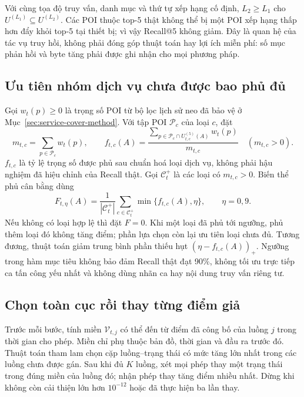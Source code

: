 Với cùng tọa độ truy vấn, danh mục và thứ tự xếp hạng cố định, $L_2\geq L_1$ cho $U^{(L_1)}\subseteq U^{(L_2)}$. Các POI thuộc top-5 thật không thể bị một POI xếp hạng thấp hơn đẩy khỏi top-5 tại thiết bị; vì vậy Recall@5 không giảm. Đây là quan hệ của tác vụ truy hồi, không phải đóng góp thuật toán hay lợi ích miễn phí: số mục phản hồi và byte tăng phải được ghi nhận cho mọi phương pháp.

\subsection{Ưu tiên nhóm dịch vụ chưa được bao phủ đủ}

Gọi $w_t(p)\geq0$ là trọng số POI từ bộ lọc lịch sử neo đã bảo vệ ở Mục~\ref{sec:service-cover-method}. Với tập POI $\mathcal P_c$ của loại $c$, đặt
\[
 m_{t,c}=\sum_{p\in\mathcal P_c}w_t(p),\qquad
 f_{t,c}(A)=\frac{\sum_{p\in\mathcal P_c\cap U_{t,c}^{(5)}(A)}w_t(p)}{m_{t,c}}
 \quad(m_{t,c}>0).
\]
$f_{t,c}$ là tỷ lệ trọng số được phủ sau chuẩn hoá loại dịch vụ, không phải hậu nghiệm đã hiệu chỉnh của Recall thật. Gọi $\mathcal C_t^+$ là các loại có $m_{t,c}>0$. Biến thể phủ cân bằng dùng
\begin{equation}
 F_{t,\eta}(A)=\frac{1}{|\mathcal C_t^+|}
       \sum_{c\in\mathcal C_t^+}\min\{f_{t,c}(A),\eta\},
 \qquad \eta=0{,}9.
 \label{eq:capped-service-cover}
\end{equation}
Nếu không có loại hợp lệ thì đặt $F=0$. Khi một loại đã phủ tới ngưỡng, phủ thêm loại đó không tăng điểm; phần lựa chọn còn lại ưu tiên loại chưa đủ. Tương đương, thuật toán giảm trung bình phần thiếu hụt $(\eta-f_{t,c}(A))_+$. Ngưỡng trong hàm mục tiêu không bảo đảm Recall thật đạt 90\%, không tối ưu trực tiếp ca tấn công yếu nhất và không dùng nhãn ca hay nội dung truy vấn riêng tư.

\subsection{Chọn toàn cục rồi thay từng điểm giả}

Trước mỗi bước, tính miền $\mathcal V_{t,j}$ có thể đến từ điểm đã công bố của luồng $j$ trong thời gian cho phép. Miền chỉ phụ thuộc bản đồ, thời gian và đầu ra trước đó. Thuật toán tham lam chọn cặp luồng--trạng thái có mức tăng lớn nhất trong các luồng chưa được gán. Sau khi đủ $K$ luồng, xét mọi phép thay một trạng thái trong đúng miền của luồng đó; nhận phép thay tăng điểm nhiều nhất. Dừng khi không còn cải thiện lớn hơn $10^{-12}$ hoặc đã thực hiện ba lần thay.

